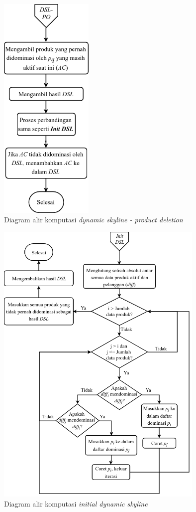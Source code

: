 \begin{figure}[H]
	\centering
	\includegraphics[width=4.5cm]{assets/img/bab3/flowchart-dsl-pd.png}
	\caption{Diagram alir komputasi \textit{dynamic skyline - product deletion}}
	\label{fig:flowchart-dsl-pd}
\end{figure}

\begin{figure}[H]
	\centering
	\includegraphics[width=10cm]{assets/img/bab3/flowchart-dsl-init.png}
	\caption{Diagram alir komputasi \textit{initial dynamic skyline}}
	\label{fig:flowchart-dsl-init}
\end{figure}

